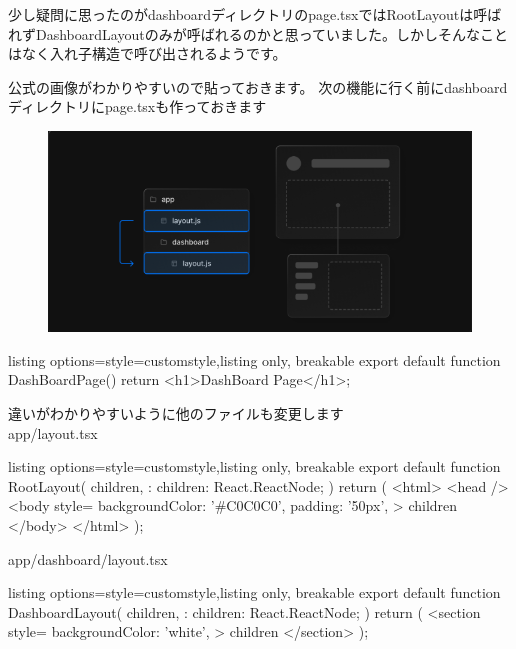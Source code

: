 少し疑問に思ったのがdashboardディレクトリのpage.tsxではRootLayoutは呼ばれずDashboardLayoutのみが呼ばれるのかと思っていました。しかしそんなことはなく入れ子構造で呼び出されるようです。

公式の画像がわかりやすいので貼っておきます。
次の機能に行く前にdashboardディレクトリにpage.tsxも作っておきます
\begin{figure}[H]
  \centering
  \includegraphics[width=12cm]{./image/03-Tech/chap4/02.png}
\end{figure}


\begin{tcblisting}{listing options={style=customstyle},listing only, breakable}
  export default function DashBoardPage() {
      return <h1>DashBoard Page</h1>;
    }

\end{tcblisting}


違いがわかりやすいように他のファイルも変更します\\
app/layout.tsx
\begin{tcblisting}{listing options={style=customstyle},listing only, breakable}
  export default function RootLayout({
      children,
    }: {
  children: React.ReactNode;
  }) {
  return (
  <html>
  <head />
  <body
  style={{
      backgroundColor: '#C0C0C0',
      padding: '50px',
    }}
  >
    {children}
  </body>
  </html>
  );
  }

\end{tcblisting}



app/dashboard/layout.tsx
\begin{tcblisting}{listing options={style=customstyle},listing only, breakable}
  export default function DashboardLayout({
      children,
    }: {
  children: React.ReactNode;
  }) {
  return (
  <section
  style={{
      backgroundColor: 'white',
    }}
  >
    {children}
  </section>
  );
  }
\end{tcblisting}



